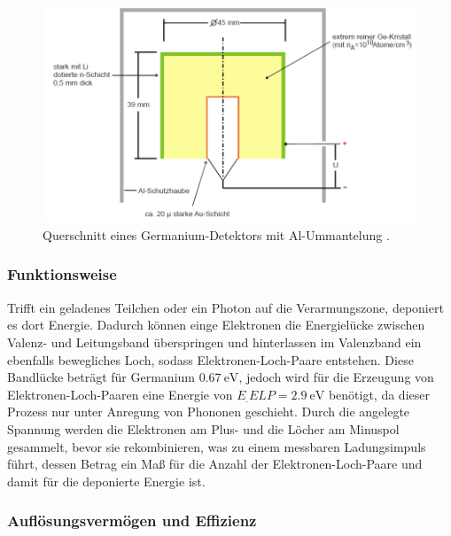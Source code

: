 \begin{figure}
	\centering
	\includegraphics[width=\linewidth-60pt,height=\textheight-60pt,keepaspectratio]{content/images/Detektor.pdf}
	\caption{Querschnitt eines Germanium-Detektors mit Al-Ummantelung \cite{V18}.}
	\label{fig:Det}
\end{figure}

\subsubsection{Funktionsweise}

Trifft ein geladenes Teilchen oder ein Photon auf die Verarmungszone, deponiert es dort Energie. Dadurch können einge Elektronen die Energielücke zwischen Valenz- und Leitungsband überspringen und hinterlassen im Valenzband ein ebenfalls bewegliches Loch, sodass Elektronen-Loch-Paare entstehen. Diese Bandlücke beträgt für Germanium $\SI{0,67}{\electronvolt}$, jedoch wird für die Erzeugung von Elektronen-Loch-Paaren eine Energie von $E_.{ELP}=\SI{2,9}{\electronvolt}$\cite{V18} benötigt, da dieser Prozess nur unter Anregung von Phononen geschieht. Durch die angelegte Spannung werden die Elektronen am Plus- und die Löcher am Minuspol gesammelt, bevor sie rekombinieren, was zu einem messbaren Ladungsimpuls führt, dessen Betrag ein Maß für die Anzahl der Elektronen-Loch-Paare und damit für die deponierte Energie ist.

\subsubsection{Auflösungsvermögen und Effizienz}
\label{subsubsec:Effizienz}

